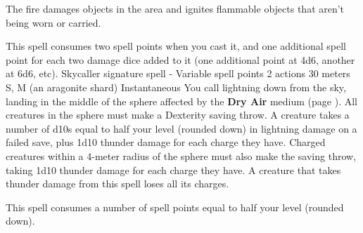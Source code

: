     The fire damages objects in the area and ignites flammable objects that aren't being worn or carried.

    This spell consumes two spell points when you cast it, and one additional spell point for each two damage dice added to it (one additional point at 4d6, another at 6d6, etc).
    {Skycaller signature spell - Variable spell points}
    {2 actions}
    {30 meters}
    {S, M (an aragonite shard)}
    {Instantaneous}
    You call lightning down from the sky, landing in the middle of the sphere affected by the \textbf{Dry Air} medium (page \pageref{medium::dryair}).
    All creatures in the sphere must make a Dexterity saving throw.
    A creature takes a number of d10s equal to half your level (rounded down) in lightning damage on a failed save, plus 1d10 thunder damage for each charge they have.
    Charged creatures within a 4-meter radius of the sphere must also make the saving throw, taking 1d10 thunder damage for each charge they have.
    A creature that takes thunder damage from this spell loses all its charges.

    This spell consumes a number of spell points equal to half your level (rounded down).
